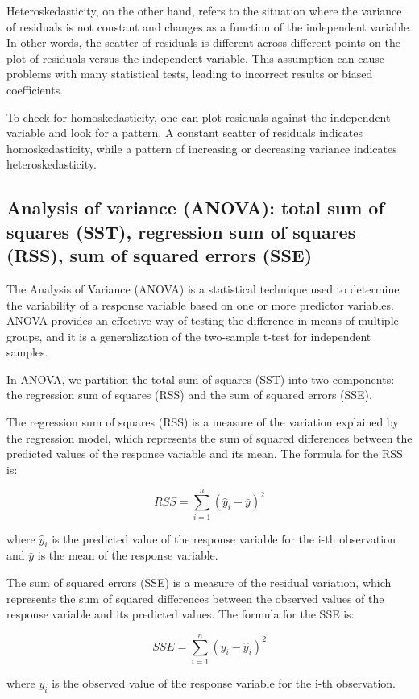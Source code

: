 \documentclass[12pt, a4paper, oneside]{article}
\begin{document}
Heteroskedasticity, on the other hand, refers to the situation where the variance of residuals is not constant and changes as a function of the independent variable. In other words, the scatter of residuals is different across different points on the plot of residuals versus the independent variable. This assumption can cause problems with many statistical tests, leading to incorrect results or biased coefficients.

To check for homoskedasticity, one can plot residuals against the independent variable and look for a pattern. A constant scatter of residuals indicates homoskedasticity, while a pattern of increasing or decreasing variance indicates heteroskedasticity.



\subsection{ Analysis of variance (ANOVA): total sum of squares (SST), regression sum of squares (RSS), sum of squared errors (SSE) }
The Analysis of Variance (ANOVA) is a statistical technique used to determine the variability of a response variable based on one or more predictor variables. ANOVA provides an effective way of testing the difference in means of multiple groups, and it is a generalization of the two-sample t-test for independent samples.

In ANOVA, we partition the total sum of squares (SST) into two components: the regression sum of squares (RSS) and the sum of squared errors (SSE).

The regression sum of squares (RSS) is a measure of the variation explained by the regression model, which represents the sum of squared differences between the predicted values of the response variable and its mean. The formula for the RSS is:

$$RSS = \sum_{i=1}^{n} (\hat{y}_i - \bar{y})^2$$

where $\hat{y}_i$ is the predicted value of the response variable for the i-th observation and $\bar{y}$ is the mean of the response variable.

The sum of squared errors (SSE) is a measure of the residual variation, which represents the sum of squared differences between the observed values of the response variable and its predicted values. The formula for the SSE is:

$$SSE = \sum_{i=1}^{n} (y_i - \hat{y}_i)^2$$

where $y_i$ is the observed value of the response variable for the i-th observation.
\end{document}

